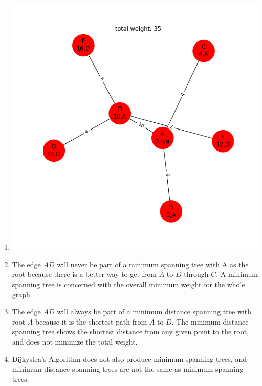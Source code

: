 \documentclass{article}
\begin{document}
\begin{enumerate}
\begin{enumerate}
  \item
    \includegraphics[width=\textwidth,height=\textheight,keepaspectratio]{5b}
  \item
    The edge $AD$ will never be part of a minimum spanning tree with A as the root because there is a better way to get from $A$ to $D$ through $C$. A minimum spanning tree is concerned with the overall minimum weight for the whole graph.
  \item
    The edge $AD$ will always be part of a minimum distance spanning tree with root $A$ because it is the shortest path from $A$ to $D$. The minimum distance spanning tree shows the shortest distance from any given point to the root, and does not minimize the total weight.
  \item
    Dijkystra's Algorithm does not also produce minimum spanning trees, and minimum distance spanning trees are not the same as minimum spanning trees.
  \end{enumerate}
  \end{enumerate}
\end{document}
